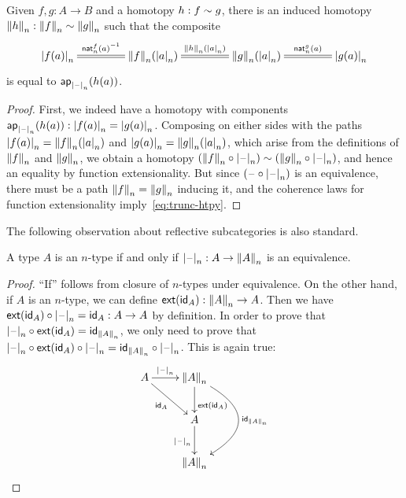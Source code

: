\begin{lem}\label{thm:trunc-htpy}
  Given $f,g:A\to B$ and a homotopy $h:f\htpy g$, there is an induced homotopy $\trunc n h : \trunc n f \htpy \trunc n g$ such that the composite
  \begin{equation}
    \xymatrix@C=3.6pc{\tproj n{f(a)} \ar@{=}[r]^-{\opp{\mathsf{nat}^f_n(a)}} &
      \trunc n f(\tproj n a) \ar@{=}[r]^-{\trunc n h(\tproj na)} &
      \trunc n g(\tproj n a) \ar@{=}[r]^-{\mathsf{nat}^g_n(a)} &
      \tproj n{g(a)}}\label{eq:trunc-htpy}
  \end{equation}
  is equal to $\apfunc{\tprojf n}(h(a))$.
\end{lem}
\begin{proof}
  First, we indeed have a homotopy with components $\apfunc{\tprojf n}(h(a)) : \tproj n{f(a)} = \tproj n{g(a)}$.
  Composing on either sides with the paths $\tproj n{f(a)} = \trunc n f(\tproj n a)$ and $\tproj n{g(a)} = \trunc n g(\tproj n a)$, which arise from the definitions of $\trunc n f$ and $\trunc ng$, we obtain a homotopy $(\trunc n f \circ \tprojf n) \htpy (\trunc n g \circ \tprojf n)$, and hence an equality by function extensionality.
  But since $(\blank\circ \tprojf n)$ is an equivalence, there must be a path $\trunc nf = \trunc ng$ inducing it, and the coherence laws for function extensionality imply~\eqref{eq:trunc-htpy}.
\end{proof}

The following observation about reflective subcategories is also standard.

\begin{cor}
  A type $A$ is an $n$-type if and only if $\tprojf n : A \to \trunc n A$ is an equivalence.
\end{cor}
\begin{proof}
  ``If'' follows from closure of $n$-types under equivalence.
  On the other hand, if $A$ is an $n$-type, we can define $\ext(\idfunc[A]):\trunc n A\to{}A$.
  Then we have $\ext(\idfunc[A])\circ\tprojf n=\idfunc[A]:A\to{}A$ by
  definition.  In order to prove that
  $\tprojf n\circ\ext(\idfunc[A])=\idfunc[\trunc nA]$, we only need to prove
  that $\tprojf n\circ\ext(\idfunc[A])\circ\tprojf n=
  \idfunc[\trunc nA]\circ\tprojf n$.
  This is again true:
  \[\raisebox{\depth-\height+1em}{\xymatrix{
    A \ar^-{\tprojf n}[r] \ar_{\idfunc[A]}[rd] &
    \trunc nA \ar^>>>{\ext(\idfunc[A])}[d] \ar@/^40pt/^{\idfunc[\trunc nA]}[dd] \\
    & A \ar_{\tprojf n}[d] \\
    & \trunc nA}}
  \qedhere\]
\end{proof}

